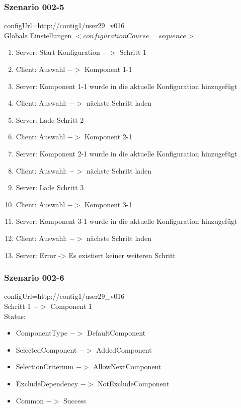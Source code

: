 \documentclass{article}
\begin{document}
\subsubsection{Szenario 002-5}

configUrl=http://contig1/user29\_v016\\

Globale Einstellungen $<configurationCourse=sequence>$

\begin{enumerate}
  \item Server: Start Konfiguration $->$ Schritt 1
  \item Client: Auswahl $->$ Komponent 1-1
  \item Server: Komponent 1-1 wurde in die aktuelle Konfiguration hinzugef\"ugt
  \item Client: Auswahl: $->$ n\"achste Schritt laden
  \item Server: Lade Schritt 2
  \item Client: Auswahl $->$ Komponent 2-1
  \item Server: Komponent 2-1 wurde in die aktuelle Konfiguration hinzugef\"ugt
  \item Client: Auswahl: $->$ n\"achste Schritt laden
  \item Server: Lade Schritt 3
  \item Client: Auswahl $->$ Komponent 3-1
  \item Server: Komponent 3-1 wurde in die aktuelle Konfiguration hinzugef\"ugt
  \item Client: Auswahl: $->$ n\"achste Schritt laden
  \item Server: Error -> Es existiert keiner weiteren Schritt
\end{enumerate}

\subsubsection{Szenario 002-6}

configUrl=http://contig1/user29\_v016\\

Schritt 1 $->$ Component 1\\

Status:

\begin{itemize}
  \item ComponentType $->$ DefaultComponent
  \item SelectedComponent $->$ AddedComponent
  \item SelectionCriterium $->$ AllowNextComponent
  \item ExcludeDependency $->$ NotExcludeComponent
  \item Common $->$ Success
\end{itemize}
\end{document}
